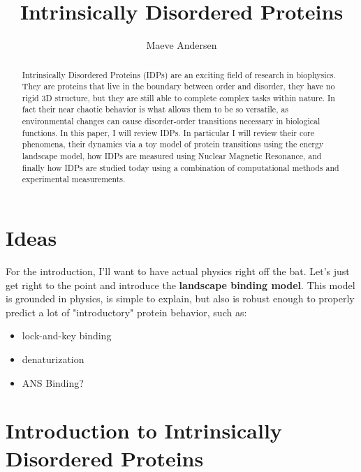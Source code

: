 \documentclass{article}
\title{Intrinsically Disordered Proteins}
\author{Maeve Andersen}
\begin{document}
\maketitle

\begin{abstract}
Intrinsically Disordered Proteins (IDPs) are an exciting field of research in biophysics. They are proteins that live in the boundary between order and disorder, they have no rigid 3D structure, but they are still able to complete complex tasks within nature. In fact their near chaotic behavior is what allows them to be so versatile, as environmental changes can cause disorder-order transitions necessary in biological functions. In this paper, I will review IDPs. In particular I will review their core phenomena, their dynamics via a toy model of protein transitions using the energy landscape model, how IDPs are measured using Nuclear Magnetic Resonance, and finally how IDPs are studied today using a combination of computational methods and experimental measurements.
\end{abstract}

\section{Ideas}

For the introduction, I'll want to have actual physics right off the bat. Let's just get right to the point and introduce the \textbf{landscape binding model}. This model is grounded in physics, is simple to explain, but also is robust enough to properly predict a lot of "introductory" protein behavior, such as:

\begin{itemize}
    \item lock-and-key binding
    \item denaturization
    \item ANS Binding?
\end{itemize}
\section{Introduction to Intrinsically Disordered Proteins}
\end{document}

